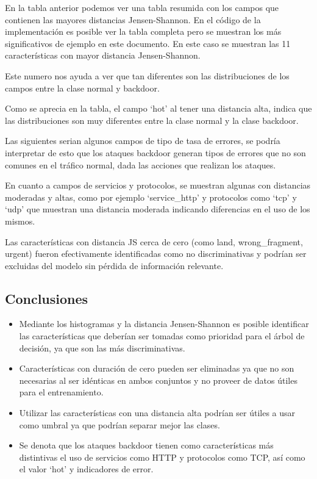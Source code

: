 \documentclass[12pt,a4paper]{article}
\begin{document}
En la tabla anterior podemos ver una tabla resumida con los campos que contienen las mayores distancias Jensen-Shannon.
En el código de la implementación es posible ver la tabla completa pero se muestran los más significativos de ejemplo en este documento.
En este caso se muestran las 11 características con mayor distancia Jensen-Shannon.

Este numero nos ayuda a ver que tan diferentes son las distribuciones de los campos entre la clase normal y backdoor.

Como se aprecia en la tabla, el campo `hot' al tener una distancia alta, indica que las distribuciones son
muy diferentes entre la clase normal y la clase backdoor.

Las siguientes serian algunos campos de tipo de tasa de errores, se podría interpretar de esto que los ataques backdoor
generan tipos de errores que no son comunes en el tráfico normal, dada las acciones que realizan los ataques.

En cuanto a campos de servicios y protocolos, se muestran algunas con distancias moderadas y altas, como por ejemplo
`service_http' y protocolos como `tcp' y `udp' que muestran una distancia moderada indicando diferencias en el uso de los mismos.

Las características con distancia JS cerca de cero (como land, wrong_fragment, urgent)
fueron efectivamente identificadas como no discriminativas y podrían ser excluidas
del modelo sin pérdida de información relevante.

\subsection{Conclusiones}\label{subsec:conclusiones}

\begin{itemize}
  \item Mediante los histogramas y la distancia Jensen-Shannon es posible identificar las características que deberían ser tomadas como prioridad para el árbol de decisión, ya que son las más discriminativas.
  \item Características con duración de cero pueden ser eliminadas ya que no son necesarias al ser idénticas en ambos conjuntos y no proveer de datos útiles para el entrenamiento.
  \item Utilizar las características con una distancia alta podrían ser útiles a usar como umbral ya que podrían separar mejor las clases.
  \item Se denota que los ataques backdoor tienen como características más distintivas el uso de servicios como HTTP y protocolos como TCP, así como el valor `hot' y indicadores de error.
\end{itemize}
\end{document}
